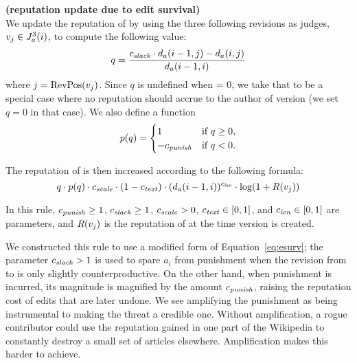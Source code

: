 \begin{regola}
\textbf{(reputation update due to edit survival)} \\
\label{rule-edit}
  We update the reputation of  by
  using the three following revisions as judges,
  $v_j \in J_{a}^{3}(i)$, to compute the following value:
\begin{equation*}
q = \frac{\slack \cdot \dist{a}{i-1,j} - \dist{a}{i,j}}
                        {\dist{a}{i-1,i}}
\label{eq-edit-long}
\end{equation*}
where $j = \mathrm{RevPos}(v_{j})$.
Since $q$ is undefined when  = 0,
we take that to be a special case where no reputation
should accrue to the author of version 
(\ie we set $q = 0$ in that case).
We also define a  function
\begin{equation*}
    p(q) =
        \begin{cases}
            1 & \text{if $q \ge 0$,} \\
            -{c_{{\text{\textit{punish}}}}} & \text{if $q < 0$.} \\
        \end{cases}
\end{equation*}

The reputation of  is then increased
according to the following formula:
\begin{equation*}
q \cdot p(q)
  \cdot {c_{{\text{\textit{scale}}}}} \cdot (1 - {c_{{\text{\textit{text}}}}}) \cdot
        (d_{a}(i-1,i))^{c_{{\text{\textit{len}}}}} \cdot \log(1 + R(v_{j}))
\end{equation*}

  In this rule, ${c_{{\text{\textit{punish}}}}} \geq 1$, ${c_{{\text{\textit{slack}}}}} \geq 1$, ${c_{{\text{\textit{scale}}}}} > 0$,
  ${c_{{\text{\textit{text}}}}} \in [0,1]$, and ${c_{{\text{\textit{len}}}}} \in [0,1]$ are parameters,
  and $R(v_{j})$ is the reputation of 
  at the time version  is created.
\end{regola}

We constructed this rule to use a modified form of
Equation~\ref{eq:esurv};
the parameter ${c_{{\text{\textit{slack}}}}} > 1$ is used to spare $a_i$ from punishment when
the revision from  to  is only slightly
counterproductive.
On the other hand, when punishment is incurred, its magnitude is
magnified by the amount ${c_{{\text{\textit{punish}}}}}$, raising the reputation cost of
edits that are later undone.
We see amplifying the punishment as being instrumental
to making the threat a credible one.
Without amplification, a rogue contributor could use the reputation
gained in one part of the Wikipedia to constantly destroy a small set
of articles elsewhere.
Amplification makes this harder to achieve.

